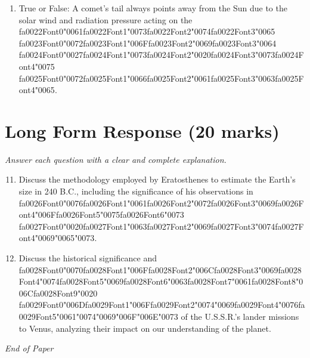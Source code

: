 \documentclass[12pt]{article}
\begin{document}
\begin{enumerate}[label=\arabic*.]
\item True or False: A comet's tail always points away from the Sun due to the solar wind and radiation pressure acting on the {\csname fa0022Font0\endcsname\char"0061}{\csname fa0022Font1\endcsname\char"0073}{\csname fa0022Font2\endcsname\char"0074}{\csname fa0022Font3\endcsname\char"0065} {\csname fa0023Font0\endcsname\char"0072}{\csname fa0023Font1\endcsname\char"006F}{\csname fa0023Font2\endcsname\char"0069}{\csname fa0023Font3\endcsname\char"0064} {\csname fa0024Font0\endcsname\char"0027}{\csname fa0024Font1\endcsname\char"0073}{\csname fa0024Font2\endcsname\char"0020}{\csname fa0024Font3\endcsname\char"0073}{\csname fa0024Font4\endcsname\char"0075} {\csname fa0025Font0\endcsname\char"0072}{\csname fa0025Font1\endcsname\char"0066}{\csname fa0025Font2\endcsname\char"0061}{\csname fa0025Font3\endcsname\char"0063}{\csname fa0025Font4\endcsname\char"0065}.
\end{enumerate}

\section*{Long Form Response (20 marks)}
\textit{Answer each question with a clear and complete explanation.}
\begin{enumerate}[label=\arabic*.]
\setcounter{enumi}{10}
\item Discuss the methodology employed by Eratosthenes to estimate the Earth's size in 240 B.C.,
including the significance of his observations in {\csname fa0026Font0\endcsname\char"0076}{\csname fa0026Font1\endcsname\char"0061}{\csname fa0026Font2\endcsname\char"0072}{\csname fa0026Font3\endcsname\char"0069}{\csname fa0026Font4\endcsname\char"006F}{\csname fa0026Font5\endcsname\char"0075}{\csname fa0026Font6\endcsname\char"0073} {\csname fa0027Font0\endcsname\char"0020}{\csname fa0027Font1\endcsname\char"0063}{\csname fa0027Font2\endcsname\char"0069}{\csname fa0027Font3\endcsname\char"0074}{\csname fa0027Font4\endcsname\char"0069}{\char"0065}{\char"0073}.
\item Discuss the historical significance and {\csname fa0028Font0\endcsname\char"0070}{\csname fa0028Font1\endcsname\char"006F}{\csname fa0028Font2\endcsname\char"006C}{\csname fa0028Font3\endcsname\char"0069}{\csname fa0028Font4\endcsname\char"0074}{\csname fa0028Font5\endcsname\char"0069}{\csname fa0028Font6\endcsname\char"0063}{\csname fa0028Font7\endcsname\char"0061}{\csname fa0028Font8\endcsname\char"006C}{\csname fa0028Font9\endcsname\char"0020} {\csname fa0029Font0\endcsname\char"006D}{\csname fa0029Font1\endcsname\char"006F}{\csname fa0029Font2\endcsname\char"0074}{\char"0069}{\csname fa0029Font4\endcsname\char"0076}{\csname fa0029Font5\endcsname\char"0061}{\char"0074}{\char"0069}{\char"006F}{\char"006E}{\char"0073} of the U.S.S.R.'s lander
missions to Venus, analyzing their impact on our understanding of the planet.
\end{enumerate}

\vfill
\noindent\textit{End of Paper}
\end{document}
